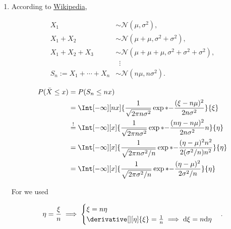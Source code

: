\begin{solution}
\begin{enumerate}[label = (\alph*)]
        \item According to \href{https://en.wikipedia.org/wiki/Sum_of_normally_distributed_random_variables#:~:text=This%20means%20that%20the%20sum,squares%20of%20the%20standard%20deviations}{Wikipedia},

        \begin{align*}
            X_1                       & \sim \mathcal N(\mu, \sigma^2), \\
            X_1 + X_2                 & \sim \mathcal N(\mu + \mu, \sigma^2 + \sigma^2), \\
            X_1 + X_2 + X_3           & \sim \mathcal N(\mu + \mu + \mu, \sigma^2 + \sigma^2 + \sigma^2), \\
                                      & \, \, \, \vdots \\
            S_n := X_1 + \cdots + X_n & \sim \mathcal N(n \mu, n \sigma^2).
        \end{align*}

        \begin{align*}
            P(\bar X \leq x)
            & =
            P(S_n \leq n x) \\
            & =
            \Int[-\infty][n x]
            {
                \frac{1}{\sqrt{2 \pi n \sigma^2}}
                \exp*
                {
                    -\frac{(\xi - n \mu)^2}{2 n \sigma^2}
                }
            }{\xi} \\
            & \stackrel{!}{=}
            \Int[-\infty][x]
            {
                \frac{1}{\sqrt{2 \pi n \sigma^2}}
                \exp*
                {
                    -\frac{(n \eta - n \mu)^2}{2 n \sigma^2}
                }
                n
            }{\eta} \\
            & =
            \Int[-\infty][x]
            {
                \frac{1}{\sqrt{2 \pi n \sigma^2 / n}}
                \exp*
                {
                    -\frac{(\eta - \mu)^2 n^2}{2 (\sigma^2 / n) n^2}
                }
            }{\eta} \\
            & =
            \Int[-\infty][x]
            {
                \frac{1}{\sqrt{2 \pi \sigma^2 / n}}
                \exp*
                {
                    -\frac{(\eta - \mu)^2}{2 \sigma^2 / n}
                }
            }{\eta}
        \end{align*}

        For \Quote{!} we used

        \begin{align*}
            \eta = \frac{\xi}{n}
            \implies
            \begin{cases}
                \xi = n \eta \\
                \derivative[][\eta]{\xi} = \frac{1}{n} \implies \mathrm d \xi = n \mathrm d \eta
            \end{cases}.
        \end{align*}

\end{enumerate}

\end{solution}

